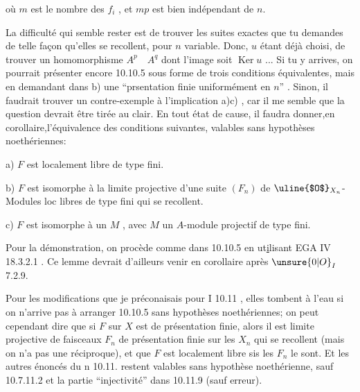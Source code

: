 où $m$ est le nombre des $f_i$ , et $mp$ est bien indépendant de $n$.

La difficulté qui  semble rester est de trouver les suites exactes que tu demandes de telle façon qu'elles se recollent, pour $n$ variable. Donc, $u$ étant déjà choisi, de trouver un homomorphisme $A^p\quad A^q$  dont l'image soit $\operatorname{Ker}u$ ... Si tu y arrives, on pourrait présenter encore 10.10.5 sous forme de trois conditions équivalentes, mais en demandant dans b) une ``prsentation finie uniformément en $n$'' . Sinon, il faudrait trouver un contre-exemple à  l'implication a)\quad c) , car il me semble que la question devrait être tirée au clair. En tout état de cause, il faudra donner,en corollaire,l'équivalence des conditions suivantes, valables sans hypothèses noethériennes:

a) $F$ est localement libre de type fini.

b) $F$ est isomorphe à la limite projective d'une suite $(F_n)$ de $\text{\uline{$O$}}_{X_n}$-Modules loc libres de type fini qui se recollent.

c) $F$ est isomorphe à un $M$ , avec $M$ un $A$-module projectif de type fini.

Pour la démonstration, on procède comme dans 10.10.5 en ut\uline{i}lisant EGA IV 18.3.2.1 . Ce lemme devrait d'ailleurs venir en corollaire  après $\unsure{0|O}_I$ 7.2.9.

Pour les modifications que je préconaisais pour I 10.11 , elles tombent à l'eau si on n'arrive pas à arranger 10.10.5 sans hypothèses noethériennes; on peut cependant dire que si $F$ sur $X$ est de présentation finie, alors il est limite projective de faisceaux $F_n$ de présentation finie sur les $X_n$ qui se recollent (mais on n'a pas une réciproque), et que $F$ est localement libre sis les $F_n$ le sont. Et  les autres énoncés du n 10.11. restent valables sans hypothèse noethérienne, sauf 10.7.11.2 et la partie ``injectivité'' dans 10.11.9 (sauf erreur).

